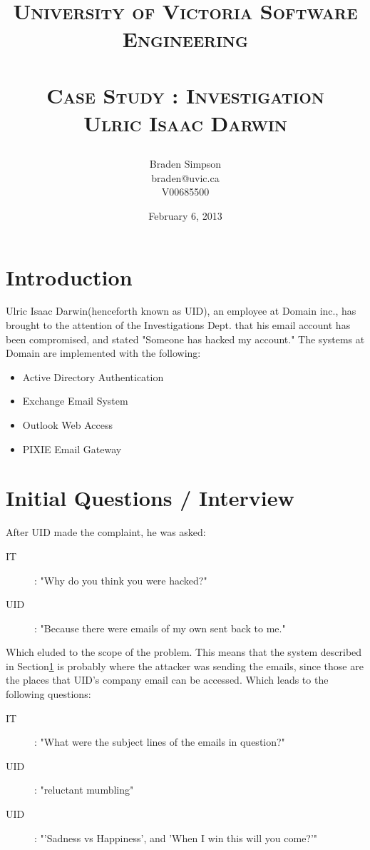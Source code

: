 \documentclass{article}
\title{
\large{\textsc{University of Victoria Software Engineering}}\huge\\ [0pt] %
\horrule{0.5pt}\\[0.4cm]
\textsc{Case Study : Investigation \\Ulric Isaac Darwin}\\
\author{Braden Simpson\\braden@uvic.ca\\V00685500}
\date{February 6, 2013}
}
\numberwithin{equation}{section} %
\numberwithin{figure}{section} %
\numberwithin{table}{section} %
\begin{document}
\maketitle %


\section{Introduction}
\label{sec:intro}
Ulric Isaac Darwin(henceforth known as UID), an employee at Domain inc., has brought to the attention of the Investigations Dept. that his email account has been compromised, and stated "Someone has hacked my account."\cite{caseKnown}  The systems at Domain are implemented with the following: 
\begin{itemize}
	\item Active Directory Authentication
	\item Exchange Email System
	\item Outlook Web Access
	\item PIXIE Email Gateway
\end{itemize}

\section{Initial Questions / Interview}
After UID made the complaint, he was asked:
\begin{description}
	\item [IT] : "Why do you think you were hacked?"
	\item [UID] : "Because there were emails of my own sent back to me."
\end{description}
Which eluded to the scope of the problem.  This means that the system described in Section\ref{sec:intro} is probably where the attacker was sending the emails, since those are the places that UID's company email can be accessed.  Which leads to the following questions: 
\begin{description}
	\item [IT] : "What were the subject lines of the emails in question?"
	\item [UID] : "reluctant mumbling"
	\item [UID] : "'Sadness vs Happiness', and 'When I win this will you come?'"
\end{description}
\end{document}
